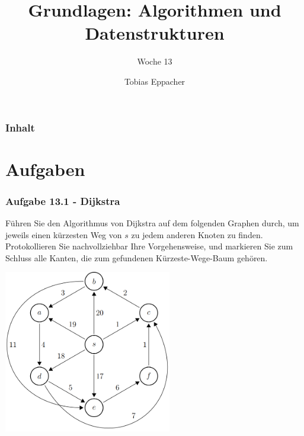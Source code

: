 \documentclass{beamer}
\title{Grundlagen: Algorithmen und Datenstrukturen}
\author{Tobias Eppacher}
\date{\presdatum}
\institute{School of Computation, Information and Technology}
\subtitle{Woche 13}
\begin{document}
\begin{frame}
	\titlepage
\end{frame}

\begin{frame}
	\frametitle{Inhalt}
	\tableofcontents[subsectionstyle=hide]
\end{frame}

\section{Aufgaben}

\begin{frame}
	\frametitle{Aufgabe 13.1 - Dijkstra}
	\scriptsize
	Führen Sie den Algorithmus von Dijkstra auf dem folgenden Graphen durch, um jeweils einen
	kürzesten Weg von $s$ zu jedem anderen Knoten zu finden. Protokollieren Sie nachvollziehbar Ihre Vorgehensweise, und markieren Sie zum Schluss alle Kanten, die zum gefundenen
	Kürzeste-Wege-Baum gehören.
	\begin{center}
		\includegraphics[width=0.55\textwidth]{images/dijkstra.png}
	\end{center}
\end{frame}
\end{document}

